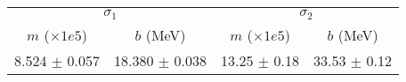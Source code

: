 \begin{tabular}{cc|cc}
\multicolumn{2}{c|}{$\sigma_1$} & \multicolumn{2}{|c}{$\sigma_2$} \\
$m$ ($\times1e5$) & $b$ (MeV) & $m$ ($\times1e5$) & $b$ (MeV) \\
\hline
8.524 $\pm$ 0.057 & 18.380 $\pm$ 0.038 & 13.25 $\pm$ 0.18 & 33.53 $\pm$ 0.12\\
\end{tabular}
